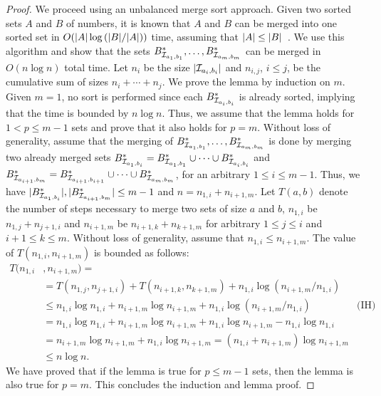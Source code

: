 \begin{proof}
    We proceed using an unbalanced merge sort approach.
    Given two sorted sets $A$ and $B$ of numbers, it is known that $A$ and $B$ can be merged into one sorted set in $O(|A| \log{(|B|/|A|)})$ time, assuming that $|A|\le |B|$~\cite{Brown1979}.
    We use this algorithm and show that the sets $B^*_{\mathcal{I}_{a_1,b_1}},\ldots,B^*_{\mathcal{I}_{a_m,b_m}}$ can be merged in $O(n \log n)$ total time.
    Let $n_i$ be the size $|\mathcal{I}_{a_i,b_i}|$ and $n_{i,j}$, $i\le j$, be the cumulative sum of sizes $n_i+\cdots+n_j$.
    We prove the lemma by induction on $m$.
    Given $m = 1$, no sort is performed since each $B^*_{\mathcal{I}_{a_i,b_i}}$ is already sorted, implying that the time is bounded by $n \log n$.
    Thus, we assume that the lemma holds for $1 < p \le m -1$ sets and prove that it also holds for $p = m$.
    Without loss of generality, assume that the merging of $B^*_{\mathcal{I}_{a_1,b_1}},\ldots,B^*_{\mathcal{I}_{a_m,b_m}}$ is done by merging two already merged sets $B^*_{\mathcal{I}_{a_1,b_i}} = B^*_{\mathcal{I}_{a_1,b_1}}\cup \cdots\cup B^*_{\mathcal{I}_{a_i,b_i}}$ and $B^*_{\mathcal{I}_{a_{i+1},b_m}} = B^*_{\mathcal{I}_{a_{i+1},b_{i+1}}}\cup \cdots \cup B^*_{\mathcal{I}_{a_m,b_m}}$, for an arbitrary $1\le i \le m-1$.
    Thus, we have $|B^*_{\mathcal{I}_{a_1,b_i}}|,|B^*_{\mathcal{I}_{a_{i+1},b_m}}|\le m-1$ and $n = n_{1,i} + n_{i+1,m}$.
    Let $T(a,b)$ denote the number of steps necessary to merge two sets of size $a$ and $b$, $n_{1,i}$ be $ n_{1,j}+n_{j+1,i}$ and $n_{i+1,m}$ be $n_{i+1,k}+n_{k+1,m}$ for arbitrary $1\le j \le i$ and $i+1\le k \le m$.
    Without loss of generality, assume that $n_{1,i} \le n_{i+1,m}$.
    The value of $T(n_{1,i},n_{i+1,m})$ is bounded as follows:
    \begin{align*}
    T(n_{1,i}&,n_{i+1,m}) =\\
    & = T(n_{1,j},n_{j+1,i})+T(n_{i+1,k},n_{k+1,m}) + n_{1,i} \log{(n_{i+1,m}/n_{1,i})}\\
    & \le n_{1,i} \log n_{1,i} + n_{i+1,m} \log n_{i+1,m} + n_{1,i} \log{(n_{i+1,m}/n_{1,i})} & \text{(IH)}\\
    & = n_{1,i} \log n_{1,i} + n_{i+1,m} \log n_{i+1,m} + n_{1,i}\log{n_{i+1,m}} - n_{1,i} \log{n_{1,i}}\\
    & = n_{i+1,m} \log n_{i+1,m} + n_{1,i}\log{n_{i+1,m}}= (n_{1,i} + n_{i+1,m})\log{n_{i+1,m}}\\
    & \le n\log n.
    \end{align*}
    We have proved that if the lemma is true for $p \le m -1$ sets, then the lemma is also true for $p =m$.
    This concludes the induction and lemma proof.
\end{proof}


